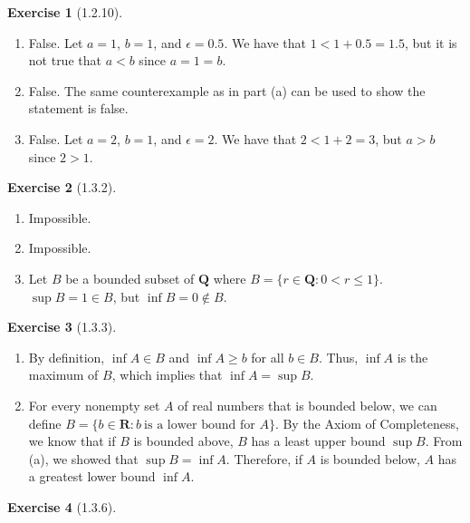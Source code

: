 \documentclass{amsart}
\theoremstyle{definition}
\newtheorem{exercise}{Exercise}
\newcommand{\Q}{\mathbf{Q}}
\newcommand{\R}{\mathbf{R}}
\newcommand{\st}{\mathrel{:}}
\begin{document}
\begin{exercise}[1.2.10]
  \begin{enumerate}[label={(\alph*)}]
    \item False. Let $a = 1$, $b = 1$, and $\epsilon = 0.5$. We have that $1 < 1
      + 0.5 = 1.5$, but it is not true that $a < b$ since $a = 1 = b$.
    \item False. The same counterexample as in part (a) can be used to show the
      statement is false.
    \item False. Let $a = 2$, $b = 1$, and $\epsilon = 2$. We have that $2 < 1 +
      2 = 3$, but $a > b$ since $2 > 1$.
  \end{enumerate}
\end{exercise}

\begin{exercise}[1.3.2]
  \begin{enumerate}[label={(\alph*)}]
    \item Impossible.
    \item Impossible.
    \item Let $B$ be a bounded subset of $\Q$ where $B = \{r \in \Q \st 0 < r
      \le 1 \}$. $\sup{B} = 1 \in B$, but $\inf{B} = 0 \notin B$.
  \end{enumerate}
\end{exercise}

\begin{exercise}[1.3.3]
  \begin{enumerate}[label={(\alph*)}]
    \item By definition, $\inf{A} \in B$ and $\inf{A} \ge b$ for all $b \in B$.
      Thus, $\inf{A}$ is the maximum of $B$, which implies that $\inf{A} =
      \sup{B}$.
    \item For every nonempty set $A$ of real numbers that is bounded below, we
      can define $B = \{b \in \R \st b\ \text{is a lower bound for $A$}\}$. By
      the Axiom of Completeness, we know that if $B$ is bounded above, $B$ has a
      least upper bound $\sup{B}$. From (a), we showed that $\sup{B} = \inf{A}$.
      Therefore, if $A$ is bounded below, $A$ has a greatest lower bound
      $\inf{A}$.
  \end{enumerate}
\end{exercise}

\begin{exercise}[1.3.6]
\end{exercise}
\end{document}
